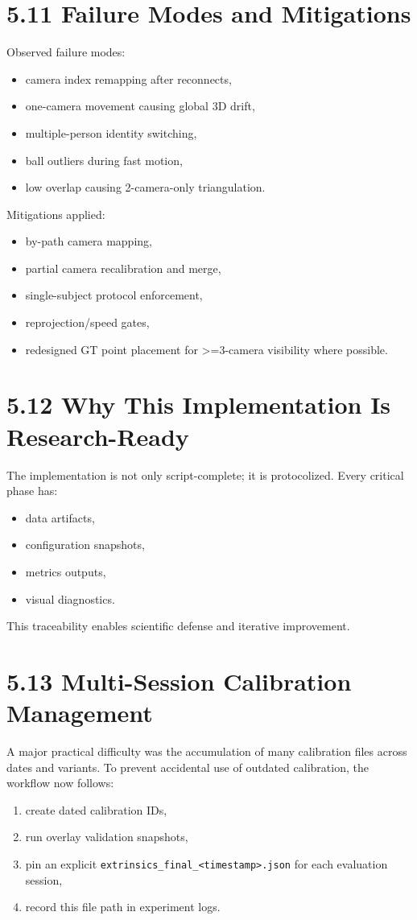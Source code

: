 \section{5.11 Failure Modes and Mitigations}
Observed failure modes:
\begin{itemize}
  \item camera index remapping after reconnects,
  \item one-camera movement causing global 3D drift,
  \item multiple-person identity switching,
  \item ball outliers during fast motion,
  \item low overlap causing 2-camera-only triangulation.
\end{itemize}

Mitigations applied:
\begin{itemize}
  \item by-path camera mapping,
  \item partial camera recalibration and merge,
  \item single-subject protocol enforcement,
  \item reprojection/speed gates,
  \item redesigned GT point placement for >=3-camera visibility where possible.
\end{itemize}

\section{5.12 Why This Implementation Is Research-Ready}
The implementation is not only script-complete; it is protocolized. Every critical phase has:
\begin{itemize}
  \item data artifacts,
  \item configuration snapshots,
  \item metrics outputs,
  \item visual diagnostics.
\end{itemize}

This traceability enables scientific defense and iterative improvement.


\section{5.13 Multi-Session Calibration Management}
A major practical difficulty was the accumulation of many calibration files across dates and variants. To prevent accidental use of outdated calibration, the workflow now follows:
\begin{enumerate}
  \item create dated calibration IDs,
  \item run overlay validation snapshots,
  \item pin an explicit \texttt{extrinsics\_final\_<timestamp>.json} for each evaluation session,
  \item record this file path in experiment logs.
\end{enumerate}

